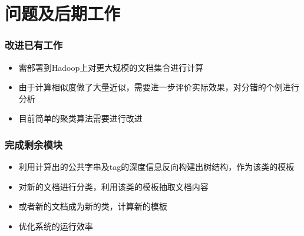 \documentclass[11pt,presentation]{beamer}
\begin{document}
\section{问题及后期工作}
\label{sec-4}
\begin{frame}
\frametitle{改进已有工作}
\label{sec-4-1}

\begin{itemize}
\item 需部署到Hadoop上对更大规模的文档集合进行计算
\item 由于计算相似度做了大量近似，需要进一步评价实际效果，对分错的个例进行分析
\item 目前简单的聚类算法需要进行改进
\end{itemize}
\end{frame}
\begin{frame}
\frametitle{完成剩余模块}
\label{sec-4-2}

\begin{itemize}
\item 利用计算出的公共字串及tag的深度信息反向构建出树结构，作为该类的模板
\item 对新的文档进行分类，利用该类的模板抽取文档内容
\item 或者新的文档成为新的类，计算新的模板
\item 优化系统的运行效率
\end{itemize}
\end{frame}
\end{document}
